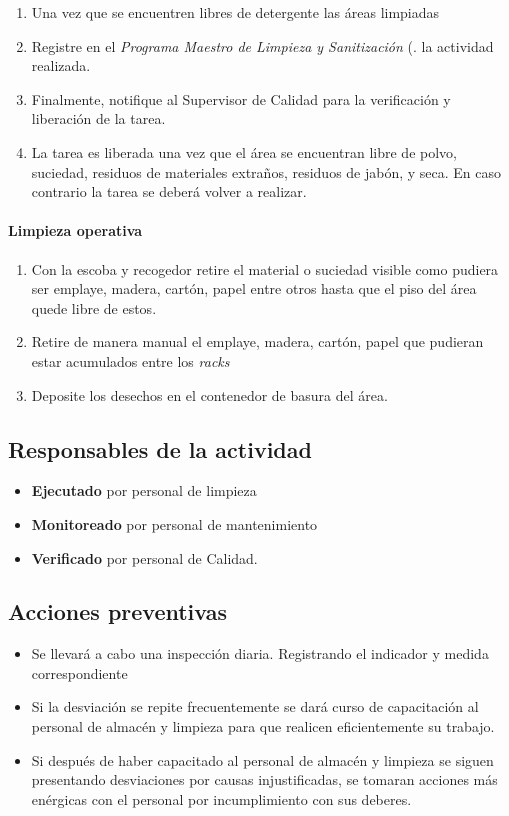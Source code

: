 \begin{enumerate}
    \item Una vez que se encuentren libres de detergente las áreas limpiadas
    \item Registre en el \emph{Programa Maestro de Limpieza y Sanitización} (\RAC. la actividad realizada.
    \item Finalmente, notifique al Supervisor de Calidad para la verificación y liberación de la tarea.
    \item La tarea es liberada una vez que el área se encuentran libre de polvo, suciedad, residuos de materiales extraños, residuos de jabón, y seca. En caso contrario la tarea se deberá volver a realizar.
\end{enumerate}

\paragraph{Limpieza operativa}

\begin{enumerate}
    \item Con la escoba y recogedor retire el material o suciedad visible como pudiera ser emplaye, madera, cartón, papel entre otros hasta que el piso del área quede libre de estos.
    \item Retire de manera manual el emplaye, madera, cartón, papel que pudieran estar acumulados entre los \textit{racks}
    \item Deposite los desechos en el contenedor de basura del área.
\end{enumerate}

\subsection{Responsables de la actividad}

\begin{itemize}
    \item \textbf{Ejecutado} por personal de limpieza
    \item \textbf{Monitoreado} por personal de mantenimiento
    \item \textbf{Verificado} por personal de Calidad.
\end{itemize}

\subsection{Acciones preventivas}

\begin{itemize}
    \item Se llevará a cabo una inspección diaria. Registrando el indicador y medida correspondiente
    \item Si la desviación se repite frecuentemente se dará curso de capacitación al personal de almacén y limpieza para que realicen eficientemente su trabajo.
    \item Si después de haber capacitado al personal de almacén y limpieza se siguen presentando desviaciones por causas injustificadas, se tomaran acciones más enérgicas con el personal por incumplimiento con sus deberes.
\end{itemize}

